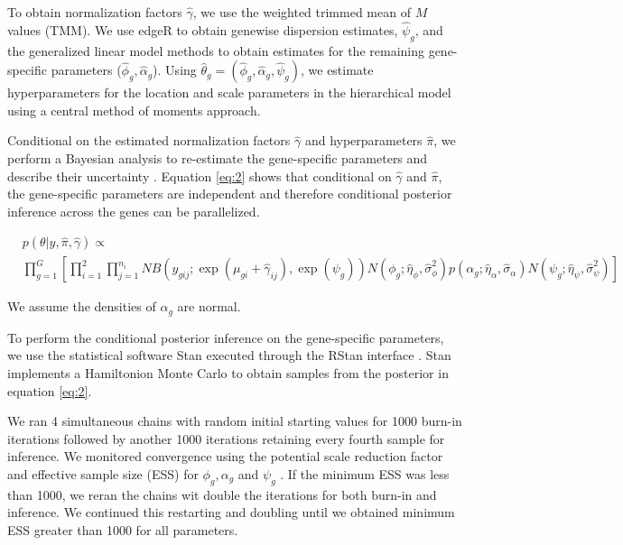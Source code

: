 \documentclass[11pt]{isuthesis}
\begin{document}
To obtain normalization factors $\hat{\gamma}$, we use the weighted trimmed mean of $M$ values (TMM). We use edgeR to obtain genewise dispersion estimates, $\hat{\psi}_g$, and the generalized linear model methods to obtain estimates for the remaining gene-specific parameters ($\hat{\phi}_g, \hat{\alpha}_g$)\citep{robinson2010scaling}. Using $\hat{\theta}_g = (\hat{\phi}_g , \hat{\alpha}_g, \hat{\psi}_g)$, we estimate hyperparameters for the location and scale parameters in the hierarchical model using a central method of moments approach. 

Conditional on the estimated normalization factors $\hat{\gamma}$ and hyperparameters $\hat{\pi}$, we perform a Bayesian analysis to re-estimate the gene-specific parameters and describe their uncertainty \citep{niemi2015empirical}. Equation \ref{eq:2} shows that conditional on $\hat{\gamma}$ and $\hat{\pi}$, the gene-specific parameters are independent and therefore conditional posterior inference across the genes can be parallelized. 

\begin{equation}
\label{eq:2}
\begin{split}
& p(\theta | y, \hat{\pi}, \hat{\gamma})  \propto \\ & \prod_{g=1}^{G} \left[ \prod_{i=1}^{2} \prod_{j=1}^{n_i} NB(y_{gij} ; \exp(\mu_{gi} + \hat{\gamma}_{ij}), \exp(\psi_g)) N(\phi_g ; \hat{\eta}_{\phi}, \hat{\sigma}^2_{\phi}) p(\alpha_g ; \hat{\eta}_{\alpha}, \hat{\sigma}_{\alpha}) N(\psi_g ; \hat{\eta}_{\psi}, \hat{\sigma}^2_{\psi})  \right]
\end{split}
\end{equation}

We assume the densities of $\alpha_g$ are normal.

To perform the conditional posterior inference on the gene-specific parameters, we use the statistical software Stan \citep{stan2014stan} executed through the RStan interface \citep{team2016rstan}. Stan implements a Hamiltonion Monte Carlo \citep{neal2011mcmc} to obtain samples from the posterior in equation \ref{eq:2}. 


We ran 4 simultaneous chains with random initial starting values for 1000 burn-in iterations followed by another 1000 iterations retaining every fourth sample for inference. We monitored convergence using the potential scale reduction factor and effective sample size (ESS) for $\phi_g, \alpha_g$ and $\psi_g$ \citep{gelman1992inference}. If the minimum ESS was less than 1000, we reran the chains wit double the iterations for both burn-in and inference. We continued this restarting and doubling until we obtained minimum ESS greater than 1000 for all parameters. 
\end{document}
